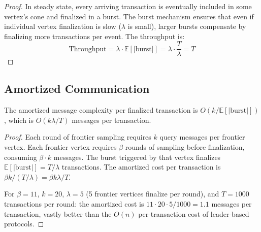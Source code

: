 \begin{proof}
In steady state, every arriving transaction is eventually included in some vertex's
cone and finalized in a burst. The burst mechanism ensures that even if individual
vertex finalization is slow ($\lambda$ is small), larger bursts compensate by
finalizing more transactions per event. The throughput is:
\[
\text{Throughput} = \lambda \cdot \mathbb{E}[|\text{burst}|] = \lambda \cdot \frac{T}{\lambda} = T
\]
\end{proof}

\subsection{Amortized Communication}

\begin{lemma}
\label{lem:nova-communication}
The amortized message complexity per finalized transaction is $O(k / \mathbb{E}[|\text{burst}|])$,
which is $O(k\lambda/T)$ messages per transaction.
\end{lemma}

\begin{proof}
Each round of frontier sampling requires $k$ query messages per frontier vertex.
Each frontier vertex requires $\beta$ rounds of sampling before finalization,
consuming $\beta \cdot k$ messages. The burst triggered by that vertex finalizes
$\mathbb{E}[|\text{burst}|] = T/\lambda$ transactions. The amortized cost per
transaction is $\beta k / (T/\lambda) = \beta k \lambda / T$.

For $\beta = 11$, $k = 20$, $\lambda = 5$ (5 frontier vertices finalize per round),
and $T = 1000$ transactions per round: the amortized cost is
$11 \cdot 20 \cdot 5 / 1000 = 1.1$ messages per transaction, vastly better than
the $O(n)$ per-transaction cost of leader-based protocols.
\end{proof}

